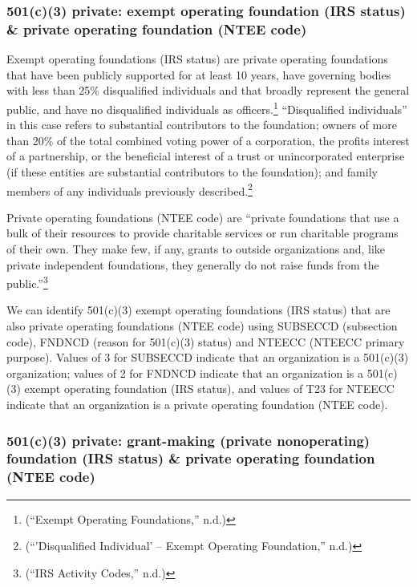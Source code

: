 \documentclass[
  letterpaper,
  DIV=11,
  numbers=noendperiod,
  oneside]{scrreprt}
\begin{document}
\hypertarget{c3-private-exempt-operating-foundation-irs-status-private-operating-foundation-ntee-code}{%
\subsubsection{501(c)(3) private: exempt operating foundation (IRS
status) \& private operating foundation (NTEE
code)}\label{c3-private-exempt-operating-foundation-irs-status-private-operating-foundation-ntee-code}}

Exempt operating foundations (IRS status) are private operating
foundations that have been publicly supported for at least 10 years,
have governing bodies with less than 25\% disqualified individuals and
that broadly represent the general public, and have no disqualified
individuals as officers.\footnote{({``Exempt Operating Foundations,''}
  n.d.)} ``Disqualified individuals'' in this case refers to substantial
contributors to the foundation; owners of more than 20\% of the total
combined voting power of a corporation, the profits interest of a
partnership, or the beneficial interest of a trust or unincorporated
enterprise (if these entities are substantial contributors to the
foundation); and family members of any individuals previously
described.\footnote{({``'Disqualified Individual' -- Exempt Operating
  Foundation,''} n.d.)}

Private operating foundations (NTEE code) are ``private foundations that
use a bulk of their resources to provide charitable services or run
charitable programs of their own. They make few, if any, grants to
outside organizations and, like private independent foundations, they
generally do not raise funds from the public.''\footnote{({``IRS
  Activity Codes,''} n.d.)}

We can identify 501(c)(3) exempt operating foundations (IRS status) that
are also private operating foundations (NTEE code) using SUBSECCD
(subsection code), FNDNCD (reason for 501(c)(3) status) and NTEECC
(NTEECC primary purpose). Values of 3 for SUBSECCD indicate that an
organization is a 501(c)(3) organization; values of 2 for FNDNCD
indicate that an organization is a 501(c)(3) exempt operating foundation
(IRS status), and values of T23 for NTEECC indicate that an organization
is a private operating foundation (NTEE code).

\hypertarget{c3-private-grant-making-private-nonoperating-foundation-irs-status-private-operating-foundation-ntee-code}{%
\subsubsection{501(c)(3) private: grant-making (private nonoperating)
foundation (IRS status) \& private operating foundation (NTEE
code)}\label{c3-private-grant-making-private-nonoperating-foundation-irs-status-private-operating-foundation-ntee-code}}
\end{document}
